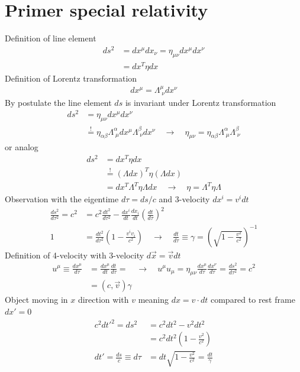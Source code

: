 \documentclass[10pt,a4paper]{article}
\theoremstyle{definition}
\begin{document}
\newpage
\section{Primer special relativity}
Definition of line element
\begin{align}
    ds^2 &= dx^\mu dx_\nu = \eta_{\mu\nu}dx^\mu dx^\nu\\
        &= dx^T\eta dx
\end{align}
Definition of Lorentz transformation
\begin{align}
    dx^\mu = \Lambda^\mu_{\;\nu}dx^\nu
\end{align}
By postulate the line element $ds$ is invariant under Lorentz transformation
\begin{align}
    ds^2 &= \eta_{\mu\nu}dx^\mu dx^\nu\\
    &\stackrel{!}{=} \eta_{\alpha\beta}\Lambda^\alpha_{\;\mu}dx^\mu \Lambda^\beta_{\;\nu}dx^\nu\quad\rightarrow\quad \eta_{\mu\nu} = \eta_{\alpha\beta}\Lambda^\alpha_{\;\mu} \Lambda^\beta_{\;\nu}
\end{align}
or analog
\begin{align}
    ds^2 &= dx^T\eta dx\\
    &\stackrel{!}{=} (\Lambda dx)^T\eta (\Lambda dx)\\
    &= dx^T\Lambda^T\eta \Lambda dx\quad\rightarrow\quad \eta = \Lambda^T\eta\Lambda
\end{align}
Observation with the eigentime $d\tau=ds/c$ and 3-velocity $dx^i = v^i dt$
\begin{align}
    \frac{ds^2}{d\tau^2}=c^2&=c^2\frac{dt^2}{d\tau^2}-\frac{dx^i}{dt}\frac{dx_i}{dt}\left(\frac{dt}{d\tau}\right)^2\\
    1&=\frac{dt^2}{d\tau^2}\left(1-\frac{v^iv_i}{c^2}\right)\quad\rightarrow\quad\frac{dt}{d\tau}\equiv\gamma=\left(\sqrt{1-\frac{v^2}{c^2}}\right)^{-1}
\end{align}
Definition of 4-velocity with 3-velocity $d\vec{x} = \vec{v} dt$
\begin{align}
    u^\mu\equiv\frac{dx^\mu}{d\tau}&=\frac{dx^\mu}{dt}\frac{dt}{d\tau}=\quad\rightarrow\quad u^\mu u_\mu=\eta_{\mu\nu}\frac{dx^\mu}{d\tau} \frac{dx^\nu}{d\tau}=\frac{ds^2}{d\tau^2}=c^2\\
    &=(c,\vec{v})\gamma
\end{align}
Object moving in $x$ direction with $v$ meaning $dx=v\cdot dt$ compared to
rest frame $dx'=0$
\begin{align}
    c^2dt'^2=ds^2 &= c^2dt^2- v^2 dt^2\\
    &=c^2dt^2\left(1-\frac{v^2}{c^2}\right)\\
    dt'=\frac{ds}{c}\equiv d\tau&=dt\sqrt{1-\frac{v^2}{c^2}}=\frac{dt}{\gamma}
\end{align}
\end{document}
